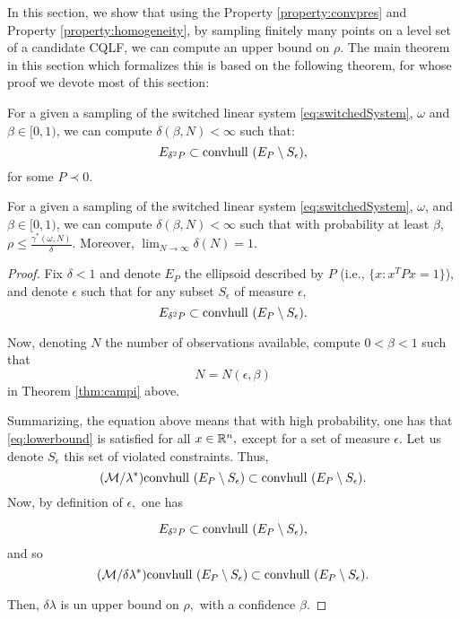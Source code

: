 In this section, we show that using the Property \ref{property:convpres} and Property \ref{property:homogeneity}, by sampling finitely many points on a level set of a candidate CQLF, we can compute an upper bound on $\rho$. The main theorem in this section which formalizes this is based on the following theorem, for whose proof we devote most of this section:

\begin{theorem} \label{thm:mainTheorem0} For a given a sampling of the switched linear system \eqref{eq:switchedSystem}, $\omega$ and $\beta \in [0,1)$, we can compute $\delta(\beta, N) < \infty$ such that:
\begin{equation}E_{\delta^2P} \subset  \mbox{convhull } (E_P\setminus S_\epsilon),
\end{equation}
for some $P \prec 0$.
\end{theorem}

\begin{theorem} \label{thm:mainTheorem} For a given a sampling of the switched linear system \eqref{eq:switchedSystem}, $\omega$, and $\beta \in [0,1)$, we can compute $\delta(\beta, N) < \infty$ such that with probability at least $\beta$, $\rho \leq \frac{\gamma^*(\omega, N)}{\delta}$. Moreover, $\lim_{N \to \infty} \delta(N) = 1$.
\end{theorem}
\begin{proof}
Fix $\delta<1$ and denote $E_P$ the ellipsoid described by $P$ (i.e., $\{x:x^TPx= 1\}$), and denote $\epsilon$ such that for any subset $S_\epsilon$ of measure $\epsilon,$ 
$$ E_{\delta^2P} \subset  \mbox{convhull } (E_P\setminus S_\epsilon) .$$ 
  	
Now, denoting $N$ the number of observations available, compute $0< \beta< 1$ such that $$N=N(\epsilon,\beta)$$ in Theorem \ref{thm:campi} above. 

Summarizing, the equation above means that with high probability, one has that \eqref{eq:lowerbound} is satisfied for all $x\in \mathbb{R}^n,$ except for a set of measure $\epsilon.$  Let us denote $S_\epsilon$ this set of violated constraints.  Thus, $$(\mathcal{M}/\lambda^*) \mbox{convhull } (E_P\setminus S_\epsilon) \subset \mbox{convhull } (E_P\setminus S_\epsilon).$$  Now, by definition of $\epsilon,$ one has

$$ E_{\delta^2P} \subset  \mbox{convhull } (E_P\setminus S_\epsilon) ,$$ and so
$$
(\mathcal{M}/\delta \lambda^*) \mbox{convhull } (E_P \setminus S_\epsilon) \subset \mbox{convhull } (E_P\setminus S_\epsilon).$$

Then, $\delta\lambda$ is un upper bound on $\rho,$ with a confidence $\beta.$ 
\end{proof}